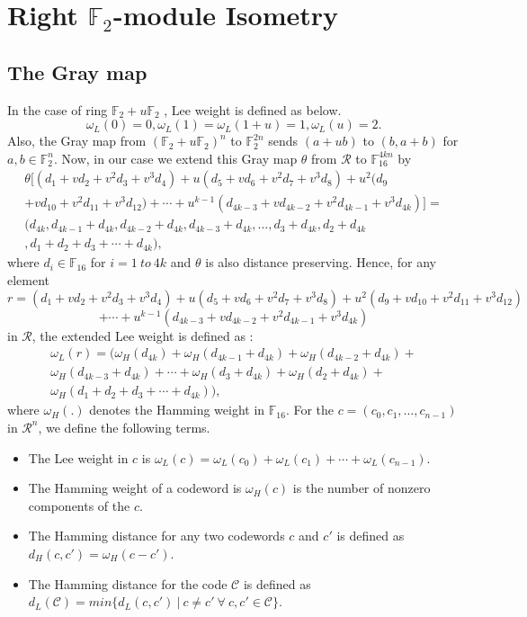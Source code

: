 \documentclass{amsart}
\theoremstyle{definition}
\theoremstyle{remark}
\numberwithin{equation}{section}
\begin{document}
\section {Right $\mathbb F_2$-module Isometry}
\subsection{The Gray map} 
In the case of ring $\mathbb{F}_2 + u\mathbb{F}_2 $ \cite{A}, Lee weight is defined as below.
    $$ \omega_L(0)=0, \omega_L(1) = \omega_L(1+u) = 1, \omega_L(u) =2.  $$
    Also, the Gray map from $(\mathbb{F}_2 + u\mathbb{F}_2)^n $ to $ \mathbb{F}_2^{2n} $ sends $ (a + ub) $ to $ (b, a+b) $ for $ a,b \in \mathbb{F}_2^{n} $. Now, in our case we extend this Gray map $\theta $ from $\mathcal{R}$ to $ \mathbb{F}_{16}^{4kn} $ by
    \begin{gather*} \theta[(d_1 + vd_2 + v^2d_3 + v^3d_4) + u(d_5 + vd_6 + v^2d_7 + v^3d_8)  + u^2(d_9 \\ + vd_{10} + v^2d_{11} + v^3d_{12})  + \cdots + u^{k-1}(d_{4k-3} + vd_{4k-2} + v^2d_{4k-1} + v^3d_{4k})]= \\
    (d_{4k} , d_{4k-1}+d_{4k} , d_{4k-2}+d_{4k} , d_{4k-3}+d_{4k}, \dots ,d_{3}+d_{4k} , d_{2}+d_{4k}\\ , d_1 + d_2 + d_3 + \cdots + d_{4k}), \end{gather*}
where $ d_i \in \mathbb{F}_{16} $ for $ i = 1~ to~ 4k $ and $\theta$ is also distance preserving. Hence, for any element 
$$r= (d_1 + vd_2 + v^2d_3 + v^3d_4) + u(d_5 + vd_6 + v^2d_7 + v^3d_8)  + u^2(d_9 + vd_{10} + v^2d_{11} + v^3d_{12}) $$ $$ + \cdots + u^{k-1}(d_{4k-3} + vd_{4k-2} + v^2d_{4k-1} + v^3d_{4k}) $$
in $\mathcal{R}$, the extended Lee weight is defined as : 
\begin{gather*}
    \omega_L(r) = (\omega_H(d_{4k}) + \omega_H(d_{4k-1}+d_{4k}) + \omega_H(d_{4k-2}+d_{4k}) +\\\omega_H( d_{4k-3}+d_{4k})+ \cdots+ \omega_H(d_{3}+d_{4k}) + \omega_H(d_{2}+d_{4k}) + \\\omega_H(d_1 + d_2 + d_3 + \cdots + d_{4k})),
    \end{gather*} 
  where $\omega_H(.)$ denotes the Hamming weight in $\mathbb{F}_{16}$. For the $ c = (c_0,c_1, \dots, c_{n-1}) $ in $\mathcal{R}^n$, we define the following terms.
\begin{itemize}
    \item The Lee weight in $c$ is $ \omega_L(c) = \omega_L(c_0) + \omega_L(c_1) + \cdots + \omega_L(c_{n-1}) $.
    \item The Hamming weight of a codeword is $ \omega_H(c) $ is the number of nonzero components of the $c$.
\item The Hamming distance for any two codewords $c$ and $c'$ is defined as \\$ d_H(c,c') =  \omega_H(c-c') $.
 \item The Hamming distance for the code $\mathcal{C}$ is defined as \\$ d_L(\mathcal{C}) = min\{ d_L(c,c') ~|~ c \neq c'~ \forall ~c,c' \in \mathcal{C} \}$.
    \end{itemize} 
\end{document}
